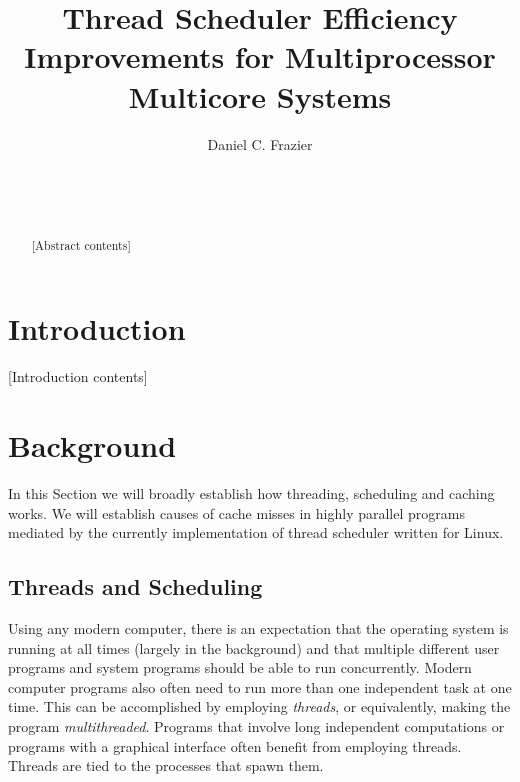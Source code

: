 \documentclass{sig-alternate}
\begin{document}

\title{Thread Scheduler Efficiency Improvements for Multiprocessor Multicore Systems}


\author{
\alignauthor
Daniel C. Frazier\\
	\\
	\\
	\\
}

\maketitle
\begin{abstract}
[Abstract contents]
\end{abstract}


\section{Introduction}
\label{sec:intro}

[Introduction contents]

\section{Background}
\label{sec:bg}

In this Section we will broadly establish how threading, scheduling and caching works. We will establish causes of cache misses in highly parallel programs mediated by the currently implementation of thread scheduler written for Linux.

\subsection{Threads and Scheduling}
\label{sec:threads}
Using any modern computer, there is an expectation that the operating system is running at all times (largely in the background) and that multiple different user programs and system programs should be able to run concurrently. Modern computer programs also often need to run more than one independent task at one time. This can be accomplished by employing \emph{threads}, or equivalently, making the program \emph{multithreaded}. Programs that involve long independent computations or programs with a graphical interface often benefit from employing threads. Threads are tied to the processes that spawn them.
\end{document}

